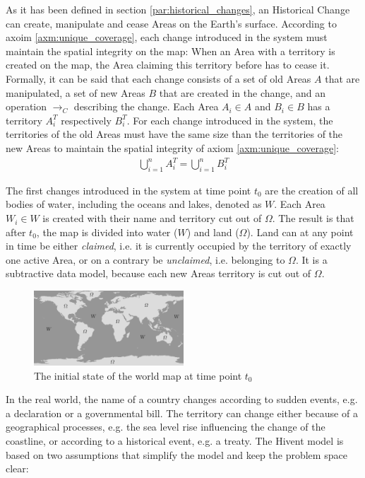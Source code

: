 As it has been defined in section \ref{par:historical_changes}, an Historical Change can create, manipulate and cease Areas on the Earth's surface. According to axoim \ref{axm:unique_coverage}, each change introduced in the system must maintain the spatial integrity on the map: When an Area with a territory is created on the map, the Area claiming this territory before has to cease it. Formally, it can be said that each change consists of a set of old Areas $A$ that are manipulated, a set of new Areas $B$ that are created in the change, and an operation $\rightarrow_C$ describing the change. Each Area $A_i \in A$ and $B_i \in B$ has a territory $A_i^T$  respectively $B_i^T$. For each change introduced in the system, the territories of the old Areas must have the same size than the territories of the new Areas to maintain the spatial integrity of axiom \ref{axm:unique_coverage}:
\begin{align*}
  \bigcup\limits_{i=1}^n A_i^T ~\textbf{=}~ \bigcup\limits_{i=1}^n B_i^T
\end{align*}

The first changes introduced in the system at time point $t_0$ are the creation of all bodies of water, including the oceans and lakes, denoted as $W$. Each Area $W_i \in W$ is created with their name and territory cut out of $\Omega$. The result is that after $t_0$, the map is divided into water ($W$) and land ($\Omega$). Land can at any point in time be either \emph{claimed}, i.e. it is currently occupied by the territory of exactly one active Area, or on a contrary be \emph{unclaimed}, i.e. belonging to $\Omega$. It is a subtractive data model, because each new Areas territory is cut out of $\Omega$.

\begin{figure}[H]
  \centering
  \includegraphics[width=0.5\textwidth]{graphics/development/hivent_model/init_map}
  \caption{The initial state of the world map at time point $t_0$}
  \label{fig:init_map}
\end{figure}

In the real world, the name of a country changes according to sudden events, e.g. a declaration or a governmental bill. The territory can change either because of a geographical processes, e.g. the sea level rise influencing the change of the coastline, or according to a historical event, e.g. a treaty. The Hivent model is based on two assumptions that simplify the model and keep the problem space clear:

